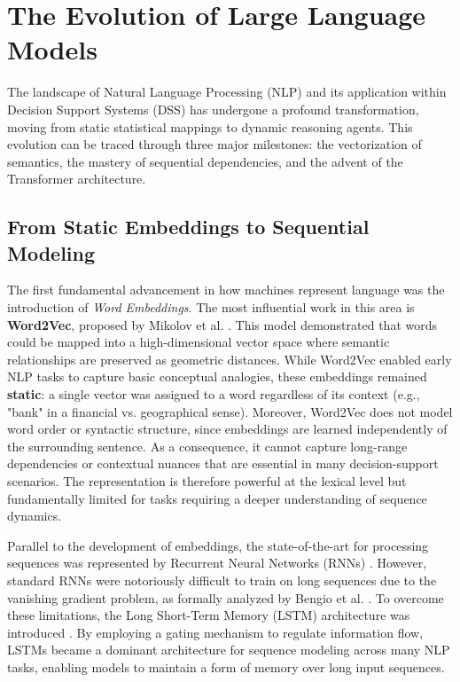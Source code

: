 \section{The Evolution of Large Language Models}
\label{sec:evolution_llm}

The landscape of Natural Language Processing (NLP) and its application within Decision Support Systems (DSS) has undergone a profound transformation, moving from static statistical mappings to dynamic reasoning agents. This evolution can be traced through three major milestones: the vectorization of semantics, the mastery of sequential dependencies, and the advent of the Transformer architecture.

\subsection{From Static Embeddings to Sequential Modeling}
The first fundamental advancement in how machines represent language was the introduction of \textit{Word Embeddings}. The most influential work in this area is \textbf{Word2Vec}, proposed by Mikolov et al. \cite{mikolov2013efficient}. This model demonstrated that words could be mapped into a high-dimensional vector space where semantic relationships are preserved as geometric distances. While Word2Vec enabled early NLP tasks to capture basic conceptual analogies, these embeddings remained \textbf{static}: a single vector was assigned to a word regardless of its context (e.g., "bank" in a financial vs. geographical sense). Moreover, Word2Vec does not model word order or syntactic structure, since embeddings are learned independently of the surrounding sentence. As a consequence, it cannot capture long-range dependencies or contextual nuances that are essential in many decision-support scenarios. The representation is therefore powerful at the lexical level but fundamentally limited for tasks requiring a deeper understanding of sequence dynamics.

Parallel to the development of embeddings, the state-of-the-art for processing sequences was represented by Recurrent Neural Networks (RNNs) \cite{rumelhart1986learning}. However, standard RNNs were notoriously difficult to train on long sequences due to the vanishing gradient problem, as formally analyzed by Bengio et al. \cite{bengio1994learning}. To overcome these limitations, the Long Short-Term Memory (LSTM) architecture was introduced \cite{hochreiter1997long}. By employing a gating mechanism to regulate information flow, LSTMs became a dominant architecture for sequence modeling across many NLP tasks, enabling models to maintain a form of memory over long input sequences.

